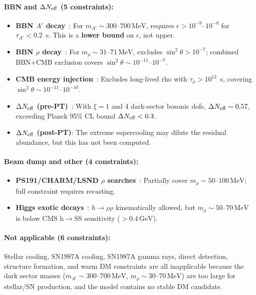 \documentclass[a4paper,11pt]{article}
\newcommand{\GeV}{\,\text{GeV}}
\newcommand{\MeV}{\,\text{MeV}}
\begin{document}
\paragraph{BBN and $\Delta N_{\rm eff}$ (5 constraints):}
\begin{itemize}
\item \textbf{BBN $A'$ decay}~\cite{coy2025}: For $m_{A'} \sim 300$--$700\MeV$, requires $\epsilon > 10^{-9}$--$10^{-8}$ for $\tau_{A'} < 0.2$~s. This is a {\bf lower bound} on $\epsilon$, not upper.
\item \textbf{BBN $\rho$ decay}~\cite{fradette2018}: For $m_\rho \sim 31$--$71\MeV$, excludes $\sin^2\theta > 10^{-7}$; combined BBN+CMB exclusion covers $\sin^2\theta \sim 10^{-11}$--$10^{-7}$.
\item \textbf{CMB energy injection}~\cite{fradette2018}: Excludes long-lived rho with $\tau_\rho > 10^{13}$~s, covering $\sin^2\theta \sim 10^{-11}$--$10^{-10}$.
\item \textbf{$\Delta N_{\rm eff}$ (pre-PT)}~\cite{planck2018}: With $\xi=1$ and 4 dark-sector bosonic dofs, $\Delta N_{\rm eff} \sim 0.57$, exceeding Planck 95\% CL bound $\Delta N_{\rm eff} < 0.3$.
\item \textbf{$\Delta N_{\rm eff}$ (post-PT)}: The extreme supercooling may dilute the residual abundance, but this has not been computed.
\end{itemize}

\paragraph{Beam dump and other (4 constraints):}
\begin{itemize}
\item \textbf{PS191/CHARM/LSND $\rho$ searches}~\cite{gorbunov2021}: Partially cover $m_\rho \sim 50$--$100\MeV$; full constraint requires recasting.
\item \textbf{Higgs exotic decays}~\cite{falkowski2015}: $h \to \rho\rho$ kinematically allowed, but $m_\rho \sim 50$--$70\MeV$ is below CMS h$\to$SS sensitivity ($>0.4\GeV$).
\end{itemize}

\paragraph{Not applicable (6 constraints):}
Stellar cooling, SN1987A cooling, SN1987A gamma rays, direct detection, structure formation, and warm DM constraints are all inapplicable because the dark sector masses ($m_{A'} \sim 300$--$700\MeV$, $m_\rho \sim 30$--$70\MeV$) are too large for stellar/SN production, and the model contains no stable DM candidate.
\end{document}
